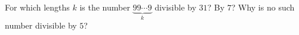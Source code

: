 For which lengths $k$ is the number $\underbrace{99\cdots9}_{k}$ divisible by $31$? By $7$? Why is no such number divisible by $5$?
